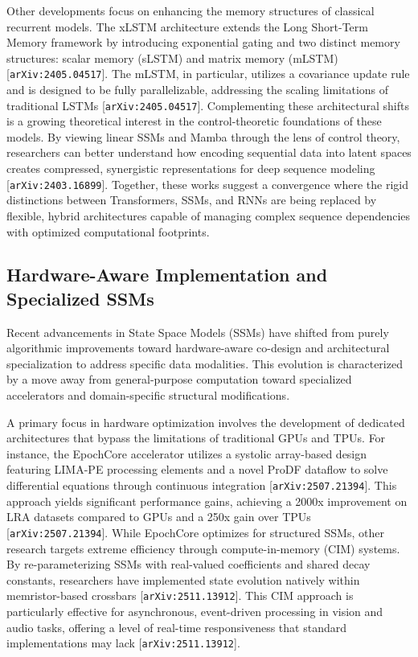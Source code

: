 \documentclass[11pt]{article}
\begin{document}
Other developments focus on enhancing the memory structures of classical recurrent models. The xLSTM architecture extends the Long Short-Term Memory framework by introducing exponential gating and two distinct memory structures: scalar memory (sLSTM) and matrix memory (mLSTM) [\texttt{arXiv:2405.04517}]. The mLSTM, in particular, utilizes a covariance update rule and is designed to be fully parallelizable, addressing the scaling limitations of traditional LSTMs [\texttt{arXiv:2405.04517}]. Complementing these architectural shifts is a growing theoretical interest in the control-theoretic foundations of these models. By viewing linear SSMs and Mamba through the lens of control theory, researchers can better understand how encoding sequential data into latent spaces creates compressed, synergistic representations for deep sequence modeling [\texttt{arXiv:2403.16899}]. Together, these works suggest a convergence where the rigid distinctions between Transformers, SSMs, and RNNs are being replaced by flexible, hybrid architectures capable of managing complex sequence dependencies with optimized computational footprints.

\subsection{Hardware-Aware Implementation and Specialized SSMs}

Recent advancements in State Space Models (SSMs) have shifted from purely algorithmic improvements toward hardware-aware co-design and architectural specialization to address specific data modalities. This evolution is characterized by a move away from general-purpose computation toward specialized accelerators and domain-specific structural modifications.

A primary focus in hardware optimization involves the development of dedicated architectures that bypass the limitations of traditional GPUs and TPUs. For instance, the EpochCore accelerator utilizes a systolic array-based design featuring LIMA-PE processing elements and a novel ProDF dataflow to solve differential equations through continuous integration [\texttt{arXiv:2507.21394}]. This approach yields significant performance gains, achieving a 2000x improvement on LRA datasets compared to GPUs and a 250x gain over TPUs [\texttt{arXiv:2507.21394}]. While EpochCore optimizes for structured SSMs, other research targets extreme efficiency through compute-in-memory (CIM) systems. By re-parameterizing SSMs with real-valued coefficients and shared decay constants, researchers have implemented state evolution natively within memristor-based crossbars [\texttt{arXiv:2511.13912}]. This CIM approach is particularly effective for asynchronous, event-driven processing in vision and audio tasks, offering a level of real-time responsiveness that standard implementations may lack [\texttt{arXiv:2511.13912}].
\end{document}
